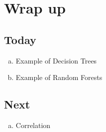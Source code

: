 \documentclass{article}
\theoremstyle{definition}
\begin{document}
  \section{Wrap up}
    \subsection{Today}
      \begin{enumerate}[(a)]
        \item Example of Decision Trees
        \item Example of Random Forests
      \end{enumerate}
    \subsection{Next}
      \begin{enumerate}[(a)]
        \item Correlation
      \end{enumerate}

\fi
\end{document}
